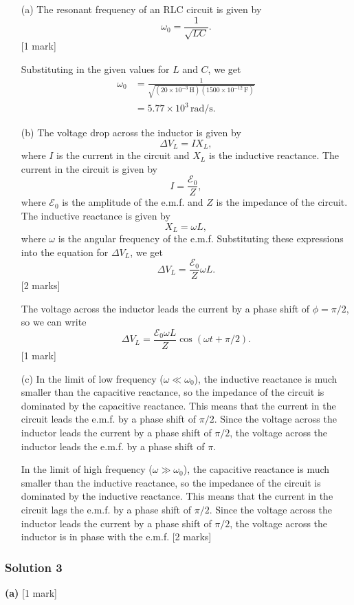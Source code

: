 \documentclass{article}
\begin{document}
\begin{enumerate}
\item[(a)] The resonant frequency of an RLC circuit is given by
\[\omega_0 = \frac{1}{\sqrt{LC}}.\][1 mark]

Substituting in the given values for $L$ and $C$, we get
\begin{align*}
\omega_0 &= \frac{1}{\sqrt{(20 \times 10^{-3}\,\mathrm{H})(1500 \times 10^{-12}\,\mathrm{F})}} \\
&= 5.77 \times 10^3\,\mathrm{rad/s}.
\end{align*}

\item[(b)] The voltage drop across the inductor is given by
\[\Delta V_L = I X_L,\]where $I$ is the current in the circuit and $X_L$ is the inductive reactance. The current in the circuit is given by
\[I = \frac{\mathcal{E}_0}{Z},\]where $\mathcal{E}_0$ is the amplitude of the e.m.f. and $Z$ is the impedance of the circuit. The inductive reactance is given by
\[X_L = \omega L,\]where $\omega$ is the angular frequency of the e.m.f. Substituting these expressions into the equation for $\Delta V_L$, we get
\[\Delta V_L = \frac{\mathcal{E}_0}{Z} \omega L.\][2 marks]

The voltage across the inductor leads the current by a phase shift of $\phi = \pi/2$, so we can write
\[\Delta V_L = \frac{\mathcal{E}_0 \omega L}{Z} \cos(\omega t + \pi/2).\][1 mark]

\item[(c)] In the limit of low frequency ($\omega \ll \omega_0$), the inductive reactance is much smaller than the capacitive reactance, so the impedance of the circuit is dominated by the capacitive reactance. This means that the current in the circuit leads the e.m.f. by a phase shift of $\pi/2$. Since the voltage across the inductor leads the current by a phase shift of $\pi/2$, the voltage across the inductor leads the e.m.f. by a phase shift of $\pi$.

In the limit of high frequency ($\omega \gg \omega_0$), the capacitive reactance is much smaller than the inductive reactance, so the impedance of the circuit is dominated by the inductive reactance. This means that the current in the circuit lags the e.m.f. by a phase shift of $\pi/2$. Since the voltage across the inductor leads the current by a phase shift of $\pi/2$, the voltage across the inductor is in phase with the e.m.f. [2 marks]
\end{enumerate}


\subsubsection{Solution 3}
\textbf{(a)} [1 mark]
\end{document}
